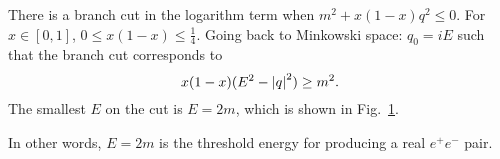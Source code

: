 \begin{remark}
  There is a branch cut in the logarithm term when $m^2 + x ( 1 - x)q^2 \leq 0$.
  For $x \in [0, 1]$, $0 \leq x (1 - x) \leq \frac{1}{4}$. Going back to Minkowski space: $q_0 = i E$ such that the branch cut corresponds to
  \begin{equation}
    x (1 - x) (E^2 - \abs{q}^2) \geq m^2.
  \end{equation}
  The smallest $E$ on the cut is $E = 2m$, which is shown in Fig.~\ref{fig:l17f1}.
  \begin{figure}[ht]
    \centering
    \caption{}
    \label{fig:l17f1}
  \end{figure}
  In other words, $E = 2m$ is the threshold energy for producing a real $e^+ e^-$ pair.
\end{remark}
